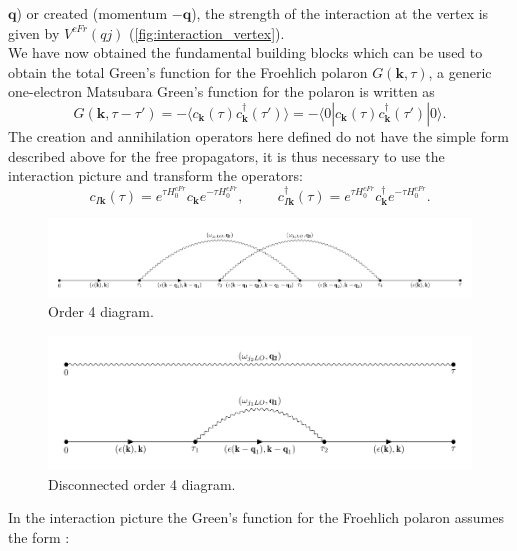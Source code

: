 $\mathbf{q}$) or created (momentum $\mathbf{-q}$), the strength of the interaction at the vertex is given by $V^{cFr}(qj)$ (\ref{fig:interaction_vertex}).\\
We have now obtained the fundamental building blocks which can be used to obtain the total Green's function for the Froehlich polaron 
$G(\mathbf{k},\tau)$, a generic one-electron Matsubara Green's function for the polaron is written as \cite{mishchenko2000diagrammatic}
\begin{equation}
    G(\mathbf{k},\tau-\tau')= -\langle c_\mathbf{k}(\tau)c^\dagger_\mathbf{k}(\tau')\rangle =-\langle 0|c_\mathbf{k}(\tau)c^\dagger_\mathbf{k}(\tau')|0\rangle.
\end{equation}
The creation and annihilation operators here defined do not have the simple form described above for the free propagators, it is thus 
necessary to use the interaction picture and transform the operators:
\begin{equation}
    c_{I\mathbf{k}}(\tau)=e^{\tau H^{cFr}_0}c_{\mathbf{k}}e^{-\tau H^{cFr}_0},\hspace{1cm}c^\dagger_{I\mathbf{k}}(\tau)=e^{\tau H^{cFr}_0}c^\dagger_{\mathbf{k}}e^{-\tau H^{cFr}_0}.
\end{equation}
\begin{figure}[H]
    \centering
    \includegraphics[scale=0.55]{diagram_order_4_2.pdf}
    \caption{Order 4 diagram.}
    \label{fig:diagram_order_4_2}
\end{figure}
\begin{figure}[H]
    \centering
    \includegraphics[scale=0.8]{diagram_disconnected.pdf}
    \caption{Disconnected order 4 diagram.}
    \label{fig:diagram_disconnected}
\end{figure}
In the interaction picture the Green's function for the Froehlich polaron assumes the form \cite{mishchenko2005diagrammatic}:
